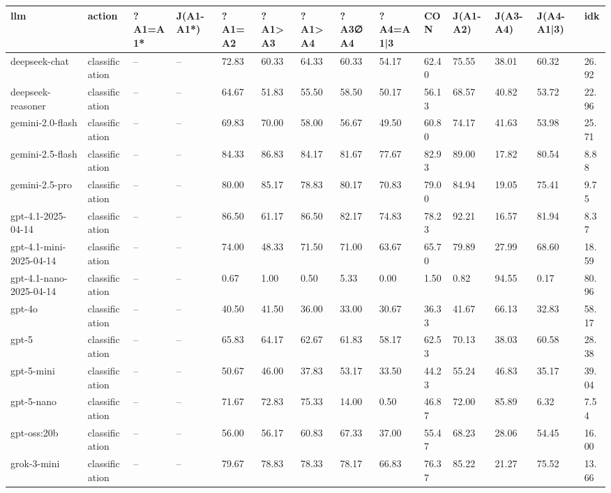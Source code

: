 \begin{table}[!t]
\centering\scriptsize
\begin{tabular}{llllllllllllll}
\toprule
llm & action & ?A1=A1* & J(A1-A1*) & ?A1=A2 & ?A1>A3 & ?A1>A4 & ?A3∅A4 & ?A4=A1|3 & CON & J(A1-A2) & J(A3-A4) & J(A4-A1|3) & idk \\
\midrule
deepseek-chat & classification & -- & -- & 72.83 & 60.33 & 64.33 & 60.33 & 54.17 & 62.40 & 75.55 & 38.01 & 60.32 & 26.92 \\
deepseek-reasoner & classification & -- & -- & 64.67 & 51.83 & 55.50 & 58.50 & 50.17 & 56.13 & 68.57 & 40.82 & 53.72 & 22.96 \\
gemini-2.0-flash & classification & -- & -- & 69.83 & 70.00 & 58.00 & 56.67 & 49.50 & 60.80 & 74.17 & 41.63 & 53.98 & 25.71 \\
gemini-2.5-flash & classification & -- & -- & 84.33 & 86.83 & 84.17 & 81.67 & 77.67 & 82.93 & 89.00 & 17.82 & 80.54 & 8.88 \\
gemini-2.5-pro & classification & -- & -- & 80.00 & 85.17 & 78.83 & 80.17 & 70.83 & 79.00 & 84.94 & 19.05 & 75.41 & 9.75 \\
gpt-4.1-2025-04-14 & classification & -- & -- & 86.50 & 61.17 & 86.50 & 82.17 & 74.83 & 78.23 & 92.21 & 16.57 & 81.94 & 8.37 \\
gpt-4.1-mini-2025-04-14 & classification & -- & -- & 74.00 & 48.33 & 71.50 & 71.00 & 63.67 & 65.70 & 79.89 & 27.99 & 68.60 & 18.59 \\
gpt-4.1-nano-2025-04-14 & classification & -- & -- & 0.67 & 1.00 & 0.50 & 5.33 & 0.00 & 1.50 & 0.82 & 94.55 & 0.17 & 80.96 \\
gpt-4o & classification & -- & -- & 40.50 & 41.50 & 36.00 & 33.00 & 30.67 & 36.33 & 41.67 & 66.13 & 32.83 & 58.17 \\
gpt-5 & classification & -- & -- & 65.83 & 64.17 & 62.67 & 61.83 & 58.17 & 62.53 & 70.13 & 38.03 & 60.58 & 28.38 \\
gpt-5-mini & classification & -- & -- & 50.67 & 46.00 & 37.83 & 53.17 & 33.50 & 44.23 & 55.24 & 46.83 & 35.17 & 39.04 \\
gpt-5-nano & classification & -- & -- & 71.67 & 72.83 & 75.33 & 14.00 & 0.50 & 46.87 & 72.00 & 85.89 & 6.32 & 7.54 \\
gpt-oss:20b & classification & -- & -- & 56.00 & 56.17 & 60.83 & 67.33 & 37.00 & 55.47 & 68.23 & 28.06 & 54.45 & 16.00 \\
grok-3-mini & classification & -- & -- & 79.67 & 78.83 & 78.33 & 78.17 & 66.83 & 76.37 & 85.22 & 21.27 & 75.52 & 13.66 \\

\end{tabular}
\end{table}
